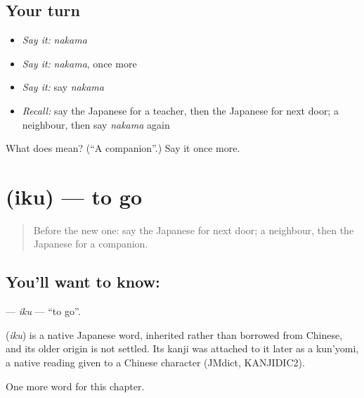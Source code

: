 \subsection*{Your turn}
\begin{itemize}
\raggedright
  \item \emph{Say it:} \emph{nakama}
  \item \emph{Say it:} \emph{nakama}, once more
  \item \emph{Say it:} say \emph{nakama}
  \item \emph{Recall:} say the Japanese for a teacher, then the Japanese for next door; a neighbour, then say \emph{nakama} again
\end{itemize}

\begin{tcolorbox}[breakable,colback=teal!4,colframe=teal!35!black,title={Before you move on}]
What does  mean? (\textquotedblleft{}A companion\textquotedblright{}.) Say it once more.
\end{tcolorbox}
\section[\texorpdfstring{\ja{いく} (iku)}{いく (iku)}]{ (iku) — to go}

\label{lesson:JA-C26-iku}



\begin{quote}
Before the new one: say the Japanese for next door; a neighbour, then the Japanese for a companion.
\end{quote}

\subsection*{You'll want to know: }
\textbf{} — \emph{iku} — \textquotedblleft{}to go\textquotedblright{}.

\begin{cousinweb}
\textbf{} (\emph{iku}) is a native Japanese word, inherited rather than borrowed from Chinese, and its older origin is not settled. Its kanji was attached to it later as a kun'yomi, a native reading given to a Chinese character (JMdict, KANJIDIC2).
\end{cousinweb}

\begin{grammarlens}[title={What you've built}]
One more word for this chapter.
\end{grammarlens}

